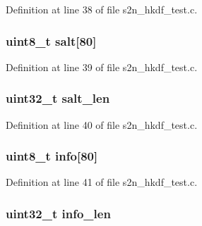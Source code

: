 Definition at line 38 of file s2n\+\_\+hkdf\+\_\+test.\+c.

\subsubsection[{\texorpdfstring{salt}{salt}}]{\setlength{\rightskip}{0pt plus 5cm}uint8\+\_\+t salt\mbox{[}80\mbox{]}}\hypertarget{structhkdf__test__vector_abc17a7721bf086ccd67438bbf98a6dd8}{}\label{structhkdf__test__vector_abc17a7721bf086ccd67438bbf98a6dd8}


Definition at line 39 of file s2n\+\_\+hkdf\+\_\+test.\+c.

\subsubsection[{\texorpdfstring{salt\+\_\+len}{salt_len}}]{\setlength{\rightskip}{0pt plus 5cm}uint32\+\_\+t salt\+\_\+len}\hypertarget{structhkdf__test__vector_ae83f31f92af369e96c05df96c88d07aa}{}\label{structhkdf__test__vector_ae83f31f92af369e96c05df96c88d07aa}


Definition at line 40 of file s2n\+\_\+hkdf\+\_\+test.\+c.

\subsubsection[{\texorpdfstring{info}{info}}]{\setlength{\rightskip}{0pt plus 5cm}uint8\+\_\+t info\mbox{[}80\mbox{]}}\hypertarget{structhkdf__test__vector_aa62dace5a347bb15b58f40c6bb176488}{}\label{structhkdf__test__vector_aa62dace5a347bb15b58f40c6bb176488}


Definition at line 41 of file s2n\+\_\+hkdf\+\_\+test.\+c.

\subsubsection[{\texorpdfstring{info\+\_\+len}{info_len}}]{\setlength{\rightskip}{0pt plus 5cm}uint32\+\_\+t info\+\_\+len}\hypertarget{structhkdf__test__vector_a5d731d05384f812f4a53d5e254d9af21}{}\label{structhkdf__test__vector_a5d731d05384f812f4a53d5e254d9af21}


